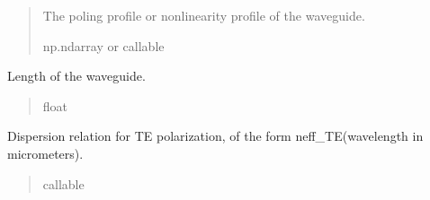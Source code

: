 \documentclass[a4paper,10pt,english]{sphinxmanual}
\begin{document}
\begin{fulllineitems}
\begin{fulllineitems}
\begin{quote}
\begin{description}
\sphinxAtStartPar
The poling profile or nonlinearity profile of the waveguide.

\sphinxAtStartPar
np.ndarray or callable

\end{description}\end{quote}

\end{fulllineitems}


\begin{fulllineitems}
\label{\detokenize{waveguide:pyjsa.waveguide.Waveguide.length}}
\pysigstartsignatures
{}
\pysigstopsignatures
\sphinxAtStartPar
Length of the waveguide.
\begin{quote}\begin{description}
\sphinxAtStartPar
float

\end{description}\end{quote}

\end{fulllineitems}


\begin{fulllineitems}
\label{\detokenize{waveguide:pyjsa.waveguide.Waveguide.neff_TE}}
\pysigstartsignatures
{}
\pysigstopsignatures
\sphinxAtStartPar
Dispersion relation for TE polarization, of the form neff\_TE(wavelength in micrometers).
\begin{quote}\begin{description}
\sphinxAtStartPar
callable

\end{description}\end{quote}

\end{fulllineitems}



\end{fulllineitems}
\end{document}
